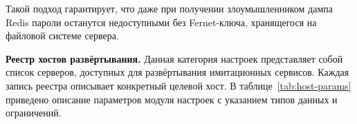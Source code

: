 Такой подход гарантирует, что даже при получении злоумышленником дампа Redis пароли останутся недоступными без Fernet-ключа, хранящегося на файловой системе сервера.

\textbf{Реестр хостов развёртывания.} Данная категория настроек представляет собой список серверов, доступных для развёртывания имитационных сервисов. Каждая запись реестра описывает конкретный целевой хост. В таблице~\ref{tab:host-params} приведено описание параметров модуля настроек с указанием типов данных и ограничений.


